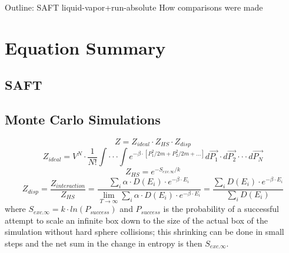 Outline:
SAFT\newline
liquid-vapor+run-absolute\newline
How comparisons were made\newline
\section{Equation Summary}
\subsection{SAFT}
\subsection{Monte Carlo Simulations}
$$Z=Z_{ideal}\cdot Z_{HS}\cdot Z_{disp}$$
$$Z_{ideal}=V^N\cdot\frac{1}{N!}\int\cdot\cdot\cdot\int e^{-\beta\cdot [P_{1}^2/{2m}+P_{2}^2/{2m}+...]}d\vec{P_1}\cdot d\vec{P_2}\cdot\cdot\cdot d\vec{P_N}$$
$$Z_{HS}=e^{-S_{exc.\infty}/k}$$
$$Z_{disp}=\frac{Z_{interaction}}{Z_{HS}}=\frac{\sum_i \alpha\cdot D(E_i)\cdot e^{-\beta\cdot E_i}}{\lim_{T\to\infty}\sum_i \alpha\cdot D(E_i)\cdot e^{-\beta\cdot E_i}}=\frac{\sum_i D(E_i)\cdot e^{-\beta\cdot E_i}}{\sum_i D(E_i)}$$
where $S_{exc.\infty}=k\cdot ln(P_{success})$ and $P_{success}$ is the probability of a successful attempt to scale an infinite box down to the size of the actual box of the simulation without hard sphere collisions; this shrinking can be done in small steps and the net sum in the change in entropy is then $S_{exc.\infty}$.


